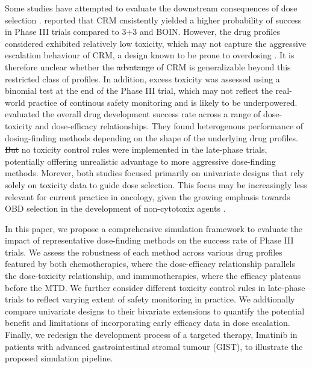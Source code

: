 \documentclass[11pt]{article}
\makeatletter
\providecommand{\DIFaddtex}[1]{{\protect\color{blue}\uwave{#1}}} %
\providecommand{\DIFdeltex}[1]{{\protect\color{red}\sout{#1}}} %
\providecommand{\DIFaddbegin}{} %
\providecommand{\DIFaddend}{} %
\providecommand{\DIFdelbegin}{} %
\providecommand{\DIFdelend}{} %
\providecommand{\DIFadd}[1]{\texorpdfstring{\DIFaddtex{#1}}{#1}} %
\providecommand{\DIFdel}[1]{\texorpdfstring{\DIFdeltex{#1}}{}} %
\newcommand{\DIFscaledelfig}{0.5}
\newlength{\DIFdelgraphicswidth} %
\newlength{\DIFdelgraphicsheight} %
\newcommand{\DIFaddincludegraphics}[2][]{{\color{blue}\fbox{\DIFOincludegraphics[#1]{#2}}}} %
\newcommand{\DIFdelincludegraphics}[2][]{%
\sbox{\DIFdelgraphicsbox}{\DIFOincludegraphics[#1]{#2}}%
\settoboxwidth{\DIFdelgraphicswidth}{\DIFdelgraphicsbox} %
\settoboxtotalheight{\DIFdelgraphicsheight}{\DIFdelgraphicsbox} %
\scalebox{\DIFscaledelfig}{%
\parbox[b]{\DIFdelgraphicswidth}{\usebox{\DIFdelgraphicsbox}\\[-\baselineskip] \rule{\DIFdelgraphicswidth}{0em}}\llap{\resizebox{\DIFdelgraphicswidth}{\DIFdelgraphicsheight}{%
\setlength{\unitlength}{\DIFdelgraphicswidth}%
\begin{picture}(1,1)%
\thicklines\linethickness{2pt} %
{\color[rgb]{1,0,0}\put(0,0){\framebox(1,1){}}}%
{\color[rgb]{1,0,0}\put(0,0){\line( 1,1){1}}}%
{\color[rgb]{1,0,0}\put(0,1){\line(1,-1){1}}}%
\end{picture}%
}\hspace*{3pt}}} %
} %
\DeclareRobustCommand{\DIFaddbegin}{\DIFOaddbegin \let\includegraphics\DIFaddincludegraphics} %
\DeclareRobustCommand{\DIFaddend}{\DIFOaddend \let\includegraphics\DIFOincludegraphics} %
\DeclareRobustCommand{\DIFdelbegin}{\DIFOdelbegin \let\includegraphics\DIFdelincludegraphics} %
\DeclareRobustCommand{\DIFdelend}{\DIFOaddend \let\includegraphics\DIFOincludegraphics} %
\let\sout@orig\sout %
\renewcommand{\sout}[1]{\ifmmode\text{\sout@orig{\ensuremath{#1}}}\else\sout@orig{#1}\fi} %
\makeatother
\begin{document}
Some studies have attempted to evaluate the downstream consequences of dose selection \DIFaddbegin \DIFadd{in Phase I}\DIFaddend . \textcite{conaway2019impact} reported that CRM cnsistently yielded a higher probability of success in Phase III trials compared to 3+3 and BOIN. However, the drug profiles considered exhibited relatively low toxicity, which may not capture the aggressive escalation behaviour of CRM, a design known to be prone to overdosing \parencite{EWOC}. It is therefore unclear whether the \DIFdelbegin \DIFdel{advatange }\DIFdelend \DIFaddbegin \DIFadd{advantange }\DIFaddend of CRM is generalizable beyond this restricted class of profiles. In addition, excess toxicity was assessed using a binomial test at the end of the Phase III trial, which may not reflect the real-world practice of continous safety monitoring and is likely to be underpowered. \textcite{ruppert2018overall} evaluated the overall drug development success rate across a range of dose-toxicity and dose-efficacy relationships. They found heterogenous performance of dosing-finding methods depending on the shape of the underlying drug profiles. \DIFdelbegin \DIFdel{But }\DIFdelend \DIFaddbegin \DIFadd{However, }\DIFaddend no toxicity control rules were implemented in the late-phase trials, potentially offfering unrealistic advantage to more aggressive dose-finding methods. Morever, both studies focused primarily on univariate designs that rely solely on toxicity data to guide dose selection. This focus may be increasingly less relevant for current practice in oncology, given the growing emphasis towards OBD selection in the development of non-cytotoxix agents \parencite{araujo2023oncology}. 

In this paper, we propose a comprehensive simulation framework to evaluate the impact of representative dose-finding methods on the success rate of Phase III trials. We assess the robustness of each method across various drug profiles featured by both chemotherapies, where the dose-efficacy relationship parallels the dose-toxicity relationship, and immunotherapies, where the efficacy plateaus before the MTD. We further consider different toxicity control rules in late-phase trials to reflect varying extent of safety monitoring in practice. We addtionally compare univariate designs to their bivariate extensions to quantify the potential benefit and limitations of incorporating early efficacy data in dose escalation. Finally, we redesign the development process of a targeted therapy, Imatinib in patients with advanced gastrointestinal stromal tumour (GIST), to illustrate the proposed simulation pipeline.
\end{document}
